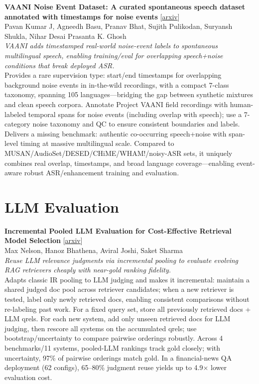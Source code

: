 \documentclass[12pt,letterpaper]{article}
\begin{document}
\medskip

{\small\textbf{VAANI Noise Event Dataset: A curated spontaneous speech dataset annotated with timestamps for noise events}} {\scriptsize[\href{https://arxiv.org/abs/2609.02474}{arxiv}]}\\
{\scriptsize Pavan Kumar J, Agneedh Basu, Pranav Bhat, Sujith Pulikodan, Suryansh Shukla, Nihar Desai Prasanta K. Ghosh}\\

{\small\textit{VAANI adds timestamped real-world noise-event labels to spontaneous multilingual speech, enabling training/eval for overlapping speech+noise conditions that break deployed ASR.}}\\[1pt]
{\footnotesize Provides a rare supervision type: start/end timestamps for overlapping background noise events in in-the-wild recordings, with a compact 7-class taxonomy, spanning 105 languages---bridging the gap between synthetic mixtures and clean speech corpora. Annotate Project VAANI field recordings with human-labeled temporal spans for noise events (including overlap with speech); use a 7-category noise taxonomy and QC to ensure consistent boundaries and labels. Delivers a missing benchmark: authentic co-occurring speech+noise with span-level timing at massive multilingual scale. Compared to MUSAN/AudioSet/DESED/CHiME/WHAM!/noisy-ASR sets, it uniquely combines real overlap, timestamps, and broad language coverage---enabling event-aware robust ASR/enhancement training and evaluation.}

\medskip


\section*{LLM Evaluation}

{\small\textbf{Incremental Pooled LLM Evaluation for Cost-Effective Retrieval Model Selection}} {\scriptsize[\href{https://arxiv.org/abs/2609.02745}{arxiv}]}\\
{\scriptsize Max Nelson, Hanoz Bhathena, Aviral Joshi, Saket Sharma}\\

{\small\textit{Reuse LLM relevance judgments via incremental pooling to evaluate evolving RAG retrievers cheaply with near-gold ranking fidelity.}}\\[1pt]
{\footnotesize Adapts classic IR pooling to LLM judging and makes it incremental: maintain a shared judged doc pool across retriever candidates; when a new retriever is tested, label only newly retrieved docs, enabling consistent comparisons without re-labeling past work. For a fixed query set, store all previously retrieved docs + LLM qrels. For each new system, add only unseen retrieved docs for LLM judging, then rescore all systems on the accumulated qrels; use bootstrap/uncertainty to compare pairwise orderings robustly. Across 4 benchmarks/11 systems, pooled-LLM rankings track gold closely; with uncertainty, 97\% of pairwise orderings match gold. In a financial-news QA deployment (62 configs), 65--80\% judgment reuse yields up to 4.9× lower evaluation cost.}
\end{document}
